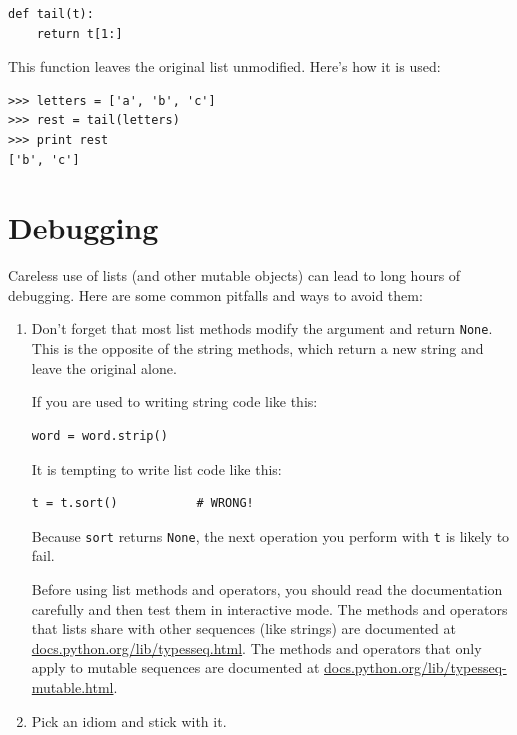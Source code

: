 \documentclass[10pt]{book}
\begin{document}
\begin{CJK}{UTF8}{gbsn}
\begin{verbatim}
def tail(t):
    return t[1:]
\end{verbatim}
%
This function leaves the original list unmodified.
Here's how it is used:

\begin{verbatim}
>>> letters = ['a', 'b', 'c']
>>> rest = tail(letters)
>>> print rest
['b', 'c']
\end{verbatim}



\section{Debugging}

Careless use of lists (and other mutable objects)
can lead to long hours of debugging.  Here are some common
pitfalls and ways to avoid them:

\begin{enumerate}

\item Don't forget that most list methods modify the argument and
  return {\tt None}.  This is the opposite of the string methods,
  which return a new string and leave the original alone.

If you are used to writing string code like this:

\begin{verbatim}
word = word.strip()
\end{verbatim}

It is tempting to write list code like this:

\begin{verbatim}
t = t.sort()           # WRONG!
\end{verbatim}

Because {\tt sort} returns {\tt None}, the
next operation you perform with {\tt t} is likely to fail.

Before using list methods and operators, you should read the
documentation carefully and then test them in interactive mode.  The
methods and operators that lists share with other sequences (like
strings) are documented at
\url{docs.python.org/lib/typesseq.html}.  The
methods and operators that only apply to mutable sequences
are documented at \url{docs.python.org/lib/typesseq-mutable.html}.


\item Pick an idiom and stick with it.


\end{enumerate}
\end{CJK}
\end{document}
